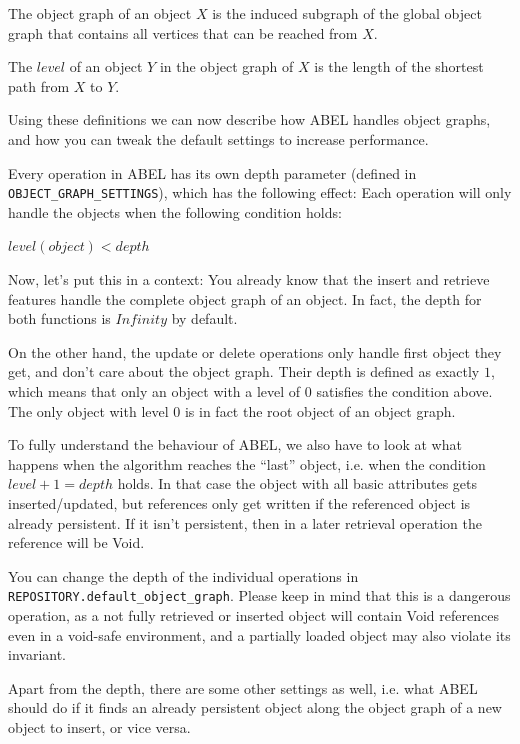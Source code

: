 The object graph of an object $X$ is the induced subgraph of the global object graph that contains all vertices that can be reached from $X$.

The $level$ of an object $Y$ in the object graph of $X$ is the length of the shortest path from $X$ to $Y$.

Using these definitions we can now describe how ABEL handles object graphs, and how you can tweak the default settings to increase performance.

Every operation in ABEL has its own depth parameter (defined in \lstinline!OBJECT_GRAPH_SETTINGS!), which has the following effect:
Each operation will only handle the objects when the following condition holds:

\begin{center}
 $ level(object) < depth $ 
\end{center}

Now, let's put this in a context:
You already know that the insert and retrieve features handle the complete object graph of an object. 
In fact, the depth for both functions is $Infinity$ by default.

On the other hand, the update or delete operations only handle first object they get, and don't care about the object graph.
Their depth is defined as exactly $1$, which means that only an object with a level of $0$ satisfies the condition above.
The only object with level $0$ is in fact the root object of an object graph.

To fully understand the behaviour of ABEL, we also have to look at what happens when the algorithm reaches the ``last'' object, i.e. when the condition $level + 1 = depth$ holds.
In that case the object with all basic attributes gets inserted/updated, but references only get written if the referenced object is already persistent.
If it isn't persistent, then in a later retrieval operation the reference will be Void.

You can change the depth of the individual operations in \lstinline!REPOSITORY.default_object_graph!. 
Please keep in mind that this is a dangerous operation, as a not fully retrieved or inserted object will contain Void references even in a void-safe environment, and a partially loaded object may also violate its invariant.

Apart from the depth, there are some other settings as well, i.e. what ABEL should do if it finds an already persistent object along the object graph of a new object to insert, or vice versa.

